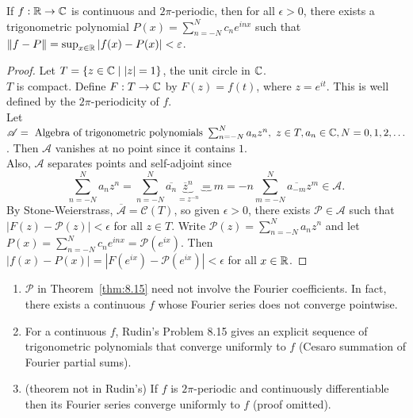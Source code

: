 \begin{thm}[15]
	If $f: \mathbb{R}\to \mathbb{C}$ is continuous and $2\pi$-periodic, then for all $\epsilon>0$, there exists a trigonometric polynomial $P(x)=\sum_{n=-N}^{N}{c_n e^{inx}}$ such that $\|f-P\|= \sup_{x \in \mathbb{R}} \left|f(x)-P(x)\right|<\varepsilon$.
	\begin{proof}
		Let $T=\{ z \in \mathbb{C} \mid \left|z\right|=1\}$, the unit circle in $\mathbb{C}$.\\
		$T$ is compact. Define $F: T\to \mathbb{C}$ by $F(z)=f(t)$, where $z=e^{it}$. This is well defined by the $2\pi$-periodicity of $f$.\\
		Let $\mathscr{A}=\text{ Algebra of trigonometric polynomials } \sum_{n=-N}^{N}{a_{n}z^{n}}, \,\, z \in T, a_{n} \in \mathbb{C}, N=0,1,2, \ldots $. Then $\mathscr{A}$ vanishes at no point since it contains $1$.\\
		Also, $\mathscr{A}$ separates points and self-adjoint since
		\[
			\sum_{n=-N}^{N}{a_{n}z^{n}}= \sum_{n=-N}^{N}{\overline{a_n} \underbrace{\overline{z}^{n}}_{=z^{-n}}}\underbrace{=}{m=-n} \sum_{m=-N}^{N}{\overline{a_{-m}} z^{m}} \in \mathscr{A}
			.\]
		By Stone-Weierstrass, $\overline{\mathscr{A}}= \mathscr{C}(T)$, so given $\epsilon>0$, there exists $\mathscr{P} \in \mathscr{A}$ such that $\left|F(z)-\mathscr{P}(z)\right|<\epsilon$ for all $z \in T$.
		Write $\mathscr{P}(z)=\sum_{n=-N}^{N}{a_n z^{n}}$ and let $P(x)=\sum_{n=-N}^{N}{c_n e^{inx}}= \mathscr{P}(e^{ix})$.
		Then $\left|f(x)-P(x)\right|=\left|F(e^{ix})-\mathscr{P}(e^{ix})\right|<\epsilon$ for all $x \in \mathbb{R}$.
	\end{proof}
	\begin{remark}
		\begin{enumerate}
			\item $\mathscr{P}$ in Theorem~\ref{thm:8.15} need not involve the Fourier coefficients. In fact, there exists a continuous $f$ whose Fourier series does not converge pointwise.
			\item For a continuous $f$, Rudin's Problem 8.15 gives an explicit sequence of trigonometric polynomials that converge uniformly to $f$ (Cesaro summation of Fourier partial sums).
			\item (theorem not in Rudin's) If $f$ is $2\pi$-periodic and continuously differentiable then its Fourier series converge uniformly to $f$ (proof omitted).
		\end{enumerate}
	\end{remark}
\end{thm}



